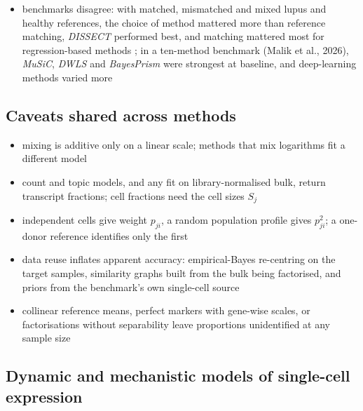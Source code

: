 \begin{itemize}
\begin{itemize}
          a disease changes expression or composition, so a reference matched to the condition of the bulk is
          preferable to a broad atlas of conditions
    \item benchmarks disagree: with matched, mismatched and mixed lupus and healthy references, the choice of method
          mattered more than reference matching, \emph{DISSECT} performed best, and matching mattered most for
          regression-based methods \cite{zhaoEvaluatingReferencemixtureMatching2026}; in a ten-method benchmark (Malik et al., 2026),
          \emph{MuSiC}, \emph{DWLS} and \emph{BayesPrism} were strongest at baseline, and deep-learning methods varied more
  \end{itemize}
\end{itemize}

\subsection{Caveats shared across methods}

\begin{itemize}
  \item mixing is additive only on a linear scale; methods that mix logarithms fit a different model
  \item count and topic models, and any fit on library-normalised bulk, return transcript fractions; cell
        fractions need the cell sizes \(S_{j}\)
  \item independent cells give weight \(p_{ji}\), a random population profile gives \(p_{ji}^{2}\); a one-donor
        reference identifies only the first
  \item data reuse inflates apparent accuracy: empirical-Bayes re-centring on the target samples, similarity
        graphs built from the bulk being factorised, and priors from the benchmark's own single-cell source
  \item collinear reference means, perfect markers with gene-wise scales, or factorisations without separability
        leave proportions unidentified at any sample size
\end{itemize}

\subsection{Dynamic and mechanistic models of single-cell expression}
\label{app:dynamic}


